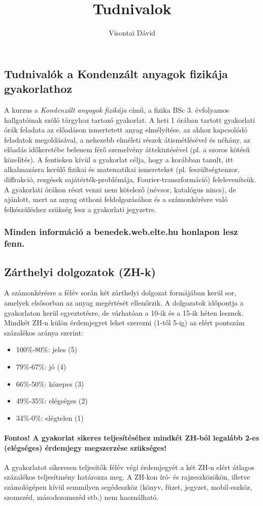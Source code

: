 \documentclass[12pt]{article}
\title{Tudnivalok}
\author{Visontai Dávid}
\begin{document}
\subsection*{Tudnivalók a Kondenzált anyagok fizikája gyakorlathoz }
\indent   
A kurzus a \emph{Kondenzált anyagok fizikája}  című, a fizika BSc 3. évfolyamos hallgatóinak szóló tárgyhoz tartozó gyakorlat. A heti 1 órában tartott gyakorlati órák feladata az előadáson ismertetett anyag elmélyítése, az ahhoz kapcsolódó feladatok megoldásával, a nehezebb elméleti részek átismétlésével és néhány, az előadás időkeretébe belenem férő szemelvény áttekintésével (pl. a szoros kötésű közelítés). A fentieken kívül a gyakorlat célja, hogy a korábban tanult, itt alkalmazásra kerülő fizikai és matematikai ismereteket (pl. feszültségtenzor, diffrakció, rezgések sajátérték-problémája, Fourier-transzformáció) felelevenítsük.
A gyakorlati órákon részt venni nem kötelező (névsor, katalógus nincs), de ajánlott, mert az anyag otthoni feldolgozásához és a számonkérésre való felkészüléshez szükség lesz a gyakorlati jegyzetre. 
\subsubsection*{Minden információ a \textbf{benedek.web.elte.hu} honlapon lesz fenn.}

\subsection*{Zárthelyi dolgozatok (ZH-k)}
A számonkérésre a félév során két zárthelyi dolgozat formájában kerül sor, amelyek elsősorban az anyag megértését ellenőrzik. A dolgozatok időpontja a gyakorlaton kerül egyeztetésre, de várhatóan a 10-ik és a 15-ik héten lesznek. Mindkét ZH-n külön érdemjegyet lehet szerezni (1-től 5-ig) az elért pontszám százalékos aránya szerint:
\begin{itemize}
\item 100\%-80\%: jeles (5)
\item 79\%-67\%: jó (4)
\item 66\%-50\%: közepes (3)
\item 49\%-35\%: elégséges (2)
\item 34\%-0\%: elégtelen (1)
\end{itemize}

\paragraph*{Fontos! A gyakorlat sikeres teljesítéséhez mindkét ZH-ból legalább 2-es (elégséges) érdemjegy megszerzése szükséges!}
A gyakorlatot sikeresen teljesítők félév végi érdemjegyét a két ZH-n elért átlagos százalékos teljesítmény határozza meg.
A ZH-kon író- és rajzeszközökön, illetve számológépen kívül semmilyen segédeszköz (könyv, füzet, jegyzet, mobil-eszköz, szomszéd, másodszomszéd stb.) nem használható. 
\end{document}
